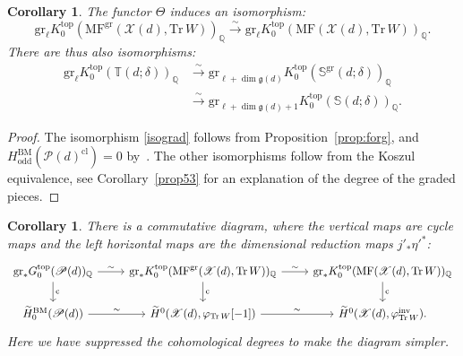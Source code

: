 \documentclass [11pt,oneside,a4paper,mathscr]{amsart}
\newtheorem{cor}[thm]{Corollary}
\theoremstyle{definition}
\newcommand{\X}{\mathscr{X}}
\begin{document}
\begin{cor}\label{cor616}
The functor $\Theta$ induces 
an isomorphism:  
    \begin{equation}\label{isograd}
        \mathrm{gr}_\ell K^{\mathrm{top}}_0\left(\mathrm{MF}^{\mathrm{gr}}(\X(d), \mathrm{Tr}\,W)\right)_{\mathbb{Q}}\xrightarrow{\sim} \mathrm{gr}_\ell K^{\mathrm{top}}_0\left(\mathrm{MF}(\X(d), \mathrm{Tr}\,W)\right)_{\mathbb{Q}}.
    \end{equation}
    There are thus also isomorphisms:
    \begin{align*}\mathrm{gr}_{\ell} K^{\mathrm{top}}_0\left(\mathbb{T}(d; \delta)\right)_{\mathbb{Q}}&\xrightarrow{\sim} \mathrm{gr}_{\ell+\dim \mathfrak{g}(d)} K^{\mathrm{top}}_0\left(\mathbb{S}^{\mathrm{gr}}(d; \delta)\right)_{\mathbb{Q}} \\
    &\xrightarrow{\sim} \mathrm{gr}_{\ell+\dim \mathfrak{g}(d)+1} K^{\mathrm{top}}_0\left(\mathbb{S}(d; \delta)\right)_{\mathbb{Q}}.\end{align*}
\end{cor}

\begin{proof}
    The isomorphism \eqref{isograd} follows from Proposition~\ref{prop:forg}, 
    and $H_{\mathrm{odd}}^{\mathrm{BM}}(\mathscr{P}(d)^{\mathrm{cl}})=0$
    by~\cite[Theorem~A]{Dav}.  The other isomorphisms follow from the Koszul equivalence, see Corollary~\ref{prop53} for an explanation of the degree of the graded pieces.
\end{proof}


    \begin{cor}\label{cor617}
    There is a commutative diagram,
    where the vertical maps are cycle maps and the left horizontal maps are the dimensional reduction maps $j'_*\eta'^*$: 
\begin{equation*}
    \begin{tikzcd}
        \mathrm{gr}_{\ast} G^{\mathrm{top}}_0(\mathscr{P}(d))_{\mathbb{Q}}\arrow[d, "\mathrm{c}"]\arrow[r, "\sim"]& \mathrm{gr}_{\ast} K^{\mathrm{top}}_0(\mathrm{MF}^{\mathrm{gr}}(\X(d), \mathrm{Tr}\,W))_{\mathbb{Q}}
        \arrow[d, "\mathrm{c}"]\arrow[r, "\sim"]&\mathrm{gr}_{\ast} K^{\mathrm{top}}_0(\mathrm{MF}(\X(d), \mathrm{Tr}\,W))_{\mathbb{Q}}\arrow[d, "\mathrm{c}"]
        \\
        \widetilde{H}^{\mathrm{BM}}_{0}(\mathscr{P}(d))\arrow[r, "\sim"]& \widetilde{H}^{0}(\X(d), \varphi_{\mathrm{Tr}\,W}[-1])\arrow[r, "\sim"]& \widetilde{H}^{0}(\X(d), \varphi_{\mathrm{Tr}\,W}^{\mathrm{inv}}).
    \end{tikzcd}
\end{equation*}
Here we have suppressed the cohomological degrees to make the diagram simpler. 
\end{cor}
\end{document}
